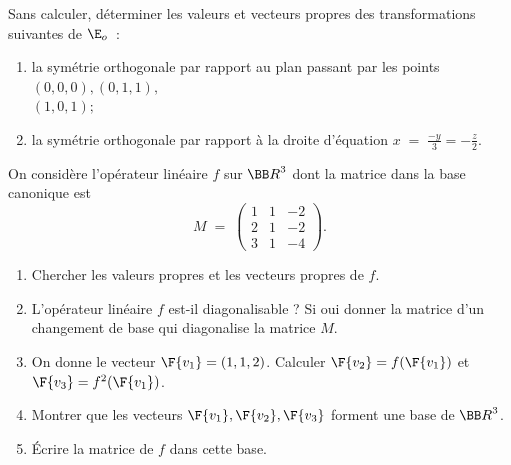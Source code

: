 \documentclass[12pt,french,oneside,a4paper]{memoir} %
\begin{document}
\begin{exo}
Sans calculer, déterminer les valeurs et vecteurs propres des 
transformations suivantes de ${\E}_o$~:
\begin{enumerate}
\item la symétrie orthogonale par rapport au plan passant par les 
points $(0,0,0), (0,1,1),$ \\ 
$(1,0,1);$
\item la symétrie orthogonale par rapport à la droite d'équation 
$x\;=\; \displaystyle{\frac{-y}{3}=- \frac{z}{2}}$.
\end{enumerate}
\end{exo}
\begin{exo}
On considère l'opérateur linéaire $f$ sur ${\BB R}^3$ dont la matrice 
dans la base canonique  est
\begin{equation*}
M\;=\; \left( \begin{array}{rrr}
1 &1 &-2 \\
2 &1 &-2 \\
3 &1 &-4
\end{array} \right).
\end{equation*}
\begin{enumerate}
\item Chercher les valeurs propres et les vecteurs propres de $f$. 
\item L'opérateur linéaire $f$ est-il diagonalisable ? Si oui donner 
la matrice d'un changement de base qui diagonalise la matrice $M$. 
\item On donne le vecteur $\F{\mathstrut{v_1}}=(1,1,2)$. Calculer 
$\F{\mathstrut{v_2}}=f(\F{\mathstrut{v_1}})$ et $\F{\mathstrut{v_3}}=f^2
(\F{\mathstrut{v_1}})$. 
\item Montrer que les vecteurs $\F{\mathstrut{v_1}}, 
\F{\mathstrut{v_2}}, \F{\mathstrut{v_3}}$ 
forment une base de ${\BB R}^3$. 
\item Écrire la matrice de $f$ dans cette base.
\end{enumerate}
\end{exo}
\end{document}
